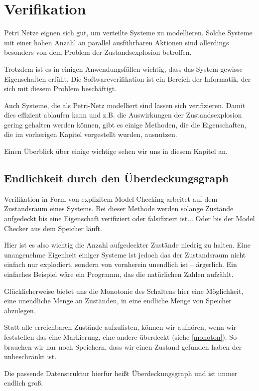 \chapter{Verifikation}
Petri Netze eignen sich gut, um verteilte Systeme zu modellieren.
Solche Systeme mit einer hohen Anzahl an parallel ausführbaren Aktionen sind allerdings besonders von dem Problem der Zustandsexplosion betroffen.

Trotzdem ist es in einigen Anwendungsfällen wichtig, dass das System gewisse Eigenschaften erfüllt.
Die Softwareverifikation ist ein Bereich der Informatik, der sich mit diesem Problem beschäftigt.

Auch Systeme, die als Petri-Netz modelliert sind lassen sich verifizieren.
Damit dies effizient ablaufen kann und z.B. die Auswirkungen der Zustandsexplosion gering gehalten werden können, gibt es einige Methoden, die die Eigenschaften, die im vorherigen Kapitel vorgestellt wurden, ausnutzen.

Einen Überblick über einige wichtige sehen wir uns in diesem Kapitel an.

\section{Endlichkeit durch den Überdeckungsgraph}
Verifikation in Form von explizitem Model Checking arbeitet auf dem Zustandsraum eines Systems.
Bei dieser Methode werden solange Zustände aufgedeckt bis eine Eigenschaft verifiziert oder falsifiziert ist... Oder bis der Model Checker aus dem Speicher läuft.

Hier ist es also wichtig die Anzahl aufgedeckter Zustände niedrig zu halten.
Eine unangenehme Eigenheit einiger Systeme ist jedoch das der Zustandsraum nicht einfach nur explodiert, sondern von vornherein unendlich ist -- ärgerlich.
Ein einfaches Beispiel wäre ein Programm, das die natürlichen Zahlen aufzählt.

Glücklicherweise bietet uns die Monotonie des Schaltens hier eine Möglichkeit, eine unendliche Menge an Zuständen, in eine endliche Menge von Speicher abzulegen.

Statt alle erreichbaren Zustände aufzulisten, können wir aufhören, wenn wir feststellen das eine Markierung, eine andere überdeckt (siehe \ref{monoton}).
So brauchen wir nur noch Speichern, dass wir einen Zustand gefunden haben der unbeschränkt ist.

Die passende Datenstruktur hierfür heißt Überdeckungsgraph und ist immer endlich groß.

